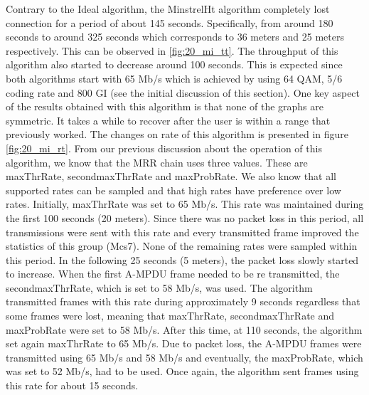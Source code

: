 \documentclass[12]{article}
\begin{document}
Contrary to the Ideal algorithm, the MinstrelHt algorithm completely lost connection for a period of about 145 seconds. Specifically, from around 180 seconds to around 325 seconds which corresponds to 36 meters and 25 meters respectively. This can be observed in \ref{fig:20_mi_tt}. The throughput of this algorithm also started to decrease around 100 seconds. This is expected since both algorithms start with 65 Mb/s which is achieved by using 64 QAM, 5/6 coding rate and 800 GI (see the initial discussion of this section). One key aspect of the results obtained with this algorithm is that none of the graphs are symmetric. It takes a while to recover after the user is within a range that previously worked. The changes on rate of this algorithm is presented in figure \ref{fig:20_mi_rt}. From our previous discussion about the operation of this algorithm, we know that the MRR chain uses three values. These are maxThrRate, secondmaxThrRate and maxProbRate. We also know that all supported rates can be sampled and that high rates have preference over low rates. Initially, maxThrRate was set to 65 Mb/s. This rate was maintained during the first 100 seconds (20 meters). Since there was no packet loss in this period, all transmissions were sent with this rate and every transmitted frame improved the statistics of this group (Mcs7). None of the remaining rates were sampled within this period. In the following 25 seconds (5 meters), the packet loss slowly started to increase. When the first A-MPDU frame needed to be re transmitted, the secondmaxThrRate, which is set to 58 Mb/s, was used. The algorithm transmitted frames with this rate during approximately 9 seconds regardless that some frames were lost, meaning that maxThrRate, secondmaxThrRate and maxProbRate were set to 58 Mb/s. After this time, at 110 seconds, the algorithm set again maxThrRate to 65 Mb/s. Due to packet loss, the A-MPDU frames were transmitted using 65 Mb/s and 58 Mb/s and eventually, the maxProbRate, which was set to 52 Mb/s, had to be used. Once again, the algorithm sent frames using this rate for about 15 seconds. \\
\end{document}
